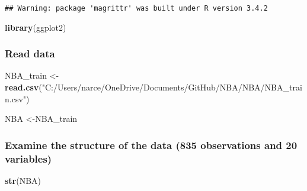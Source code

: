 \documentclass[]{article}
\newenvironment{Shaded}{\begin{snugshade}}{\end{snugshade}}
\newcommand{\KeywordTok}[1]{\textcolor[rgb]{0.13,0.29,0.53}{\textbf{{#1}}}}
\newcommand{\StringTok}[1]{\textcolor[rgb]{0.31,0.60,0.02}{{#1}}}
\newcommand{\NormalTok}[1]{{#1}}
\begin{document}
\begin{verbatim}
## Warning: package 'magrittr' was built under R version 3.4.2
\end{verbatim}

\begin{Shaded}
\begin{Highlighting}[]
\KeywordTok{library}\NormalTok{(ggplot2)}
\end{Highlighting}
\end{Shaded}

\subsubsection{Read data}\label{read-data}

\begin{Shaded}
\begin{Highlighting}[]
\NormalTok{NBA_train <-}\StringTok{ }\KeywordTok{read.csv}\NormalTok{(}\StringTok{"C:/Users/narce/OneDrive/Documents/GitHub/NBA/NBA/NBA_train.csv"}\NormalTok{)}

\NormalTok{NBA <-NBA_train}
\end{Highlighting}
\end{Shaded}

\subsubsection{Examine the structure of the data (835 observations and
20
variables)}\label{examine-the-structure-of-the-data-835-observations-and-20-variables}

\begin{Shaded}
\begin{Highlighting}[]
\KeywordTok{str}\NormalTok{(NBA)}
\end{Highlighting}
\end{Shaded}
\end{document}
